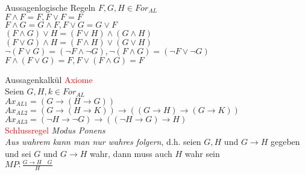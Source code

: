\begin{frame}{Aussagenlogische Regeln}
	$F,G,H\in For_{AL}$\\
	$F\wedge F=F,F\vee F=F$\\
	$F\wedge G=G\wedge F, F\vee G=G\vee F$\\
	$(F\wedge G)\vee H=(F\vee H)\wedge(G\wedge H)$\\
	$(F\vee G)\wedge H=(F\wedge H)\vee(G\vee H)$\\
	$\neg(F\vee G)=(\neg F\wedge\neg G), \neg(F\wedge G)=(\neg F\vee\neg G)$\\
	$F\wedge(F\vee G)=F, F\vee(F\wedge G)=F$\\
\end{frame}
\begin{frame}{Aussagenkalkül}
	\textcolor{red}{Axiome}\\
	Seien $G,H,k\in For_{AL}$\\
	$Ax_{AL1} = (G\rightarrow(H\rightarrow G))$\\
	$Ax_{AL2} = (G\rightarrow(H\rightarrow K))\rightarrow((G\rightarrow H)\rightarrow(G\rightarrow K))$\\
	$Ax_{AL3} = (\neg H\rightarrow\neg G)\rightarrow((\neg H\rightarrow G)\rightarrow H)$\\
	\textcolor{red}{Schlussregel} \emph{Modus Ponens}\\
	\emph{Aus wahrem kann man nur wahres folgern}, d.h. seien $G, H$ und $G\rightarrow H$ gegeben und sei $G$ und $G\rightarrow H$ wahr, dann muss auch $H$ wahr sein\\
	$MP : \frac{G\rightarrow H\quad G}{H}$\\
\end{frame}

\ifdefined\showSolutions
	\title[Aufgabe 1]{}
	
	\title[Lösungen 1]{}
	
	\title[Aufgabe 2]{}
	
	\title[Lösungen 2]{}
	
	\title[Aufgabe 3]{}
	
	\title[Lösungen 3]{}
	
\else
	\title[Aufgabe 1]{}
	
	\title[Aufgabe 2]{}
	
	\title[Aufgabe 3]{}
	
\fi
